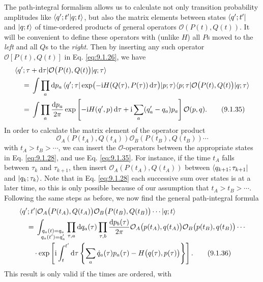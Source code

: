 The path-integral formalism allows us to calculate not only transition
probability amplitudes like $\langle q';t' | q;t\rangle$, but also the matrix
elements between states $\langle q';t'\rvert$ and $\lvert q;t\rangle$ of time-ordered
products of general operators $\mathcal{O}(P(t),Q(t))$. It will be convenient
to define these operators with (unlike $H$) all $P$s moved to the \emph{left}
and all $Q$s to the \emph{right}. Then by inserting any such operator
$\mathcal{O}[P(t),Q(t)]$ in Eq. \eqref{eq:9.1.26}, we have
\begin{align}
  &\langle q';\tau+\mathop{}\!\mathrm{d}\tau\rvert\mathcal{O}\bigl(P(t),Q(t)\bigr)\lvert q;\tau\rangle
  \notag\\
  &\quad={}
  \int\prod_a \mathop{}\!\mathrm{d} p_a\,
  \langle q';\tau\rvert\exp\bigl(-\mathrm{i} H(Q(\tau),P(\tau))\mathop{}\!\mathrm{d}\tau\bigr)\lvert p;\tau\rangle
  \langle p;\tau\rvert\mathcal{O}\bigl(P(t),Q(t)\bigr)\lvert q;\tau\rangle
  \notag\\
  &\quad={}
  \int\prod_a\frac{\mathop{}\!\mathrm{d} p_a}{2\pi}
  \exp\left[-\mathrm{i} H(q',p)\mathop{}\!\mathrm{d}\tau+\mathrm{i}\sum_a(q'_a-q_a)p_a\right]
  \mathcal{O}(p,q).
  \tag{9.1.35}\label{eq:9.1.35}
\end{align}
In order to calculate the matrix element of the operator product
\[
 \mathcal{O}_A(P(t_A),Q(t_A))
 \mathcal{O}_B(P(t_B),Q(t_B))\cdots
\]
with $t_A>t_B>\cdots$, we can insert the $\mathcal{O}$-operators
between the appropriate states in Eq. \eqref{eq:9.1.28}, and use Eq. \eqref{eq:9.1.35}. For
instance, if the time $t_A$ falls between $\tau_k$ and $\tau_{k+1}$, then
insert $\mathcal{O}_A(P(t_A),Q(t_A))$ between $\langle q_{k+1};\tau_{k+1}\rvert$
and $\lvert q_k;\tau_k\rangle$. Note that in Eq. \eqref{eq:9.1.28} each successive sum over
states is at a later time, so this is only possible because of our assumption
that $t_A>t_B>\cdots$. Following the same steps as before, we now find the
general path-integral formula
\begin{align}
  &\langle q';t'\rvert\mathcal{O}_A\bigl(P(t_A),Q(t_A)\bigr)
  \mathcal{O}_B\bigl(P(t_B),Q(t_B)\bigr)\cdots\lvert q;t\rangle
  \notag\\
  &\quad={}
  \int_{\substack{q_a(t)=q_a\\q_a(t')=q'_a}}
  \prod_{\tau,a}\mathop{}\!\mathrm{d} q_a(\tau)\prod_{\tau,b}\frac{\mathop{}\!\mathrm{d} p_b(\tau)}{2\pi}
  \mathcal{O}_A\bigl(p(t_A),q(t_A)\bigr)
  \mathcal{O}_B\bigl(p(t_B),q(t_B)\bigr)\cdots
  \notag\\
  &\qquad\cdot\exp\left[\mathrm{i}\int_t^{t'}\mathop{}\!\mathrm{d}\tau
  \left\{\sum_a\dot q_a(\tau)p_a(\tau)
  -H\bigl(q(\tau),p(\tau)\bigr)\right\}\right].
  \tag{9.1.36}\label{eq:9.1.36}
\end{align}
This result is only valid if the times are ordered, with
